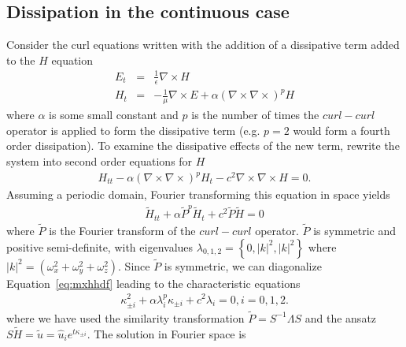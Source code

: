 \documentclass[12pt]{article}
\begin{document}
\subsection{Dissipation in the continuous case}
Consider the curl
equations written with the addition of a dissipative term added to the $H$ equation
\begin{eqnarray}
E_t &=&\frac{1}{\epsilon}\nabla \times H \label{eq:mxed}\\
H_t &=& -\frac{1}{\mu}\nabla \times E +\alpha(\nabla\times\nabla\times)^p H\label{eq:mxhd}
\end{eqnarray}
where $\alpha$ is some small constant and $p$ is the number of times
the $curl-curl$ operator is applied to form the dissipative term
(e.g. $p=2$ would form a fourth order dissipation).  To examine the
dissipative effects of the new term, rewrite the system into 
second order equations for $H$
\begin{eqnarray}
H_{tt} -\alpha(\nabla\times\nabla\times)^p H_t -c^2\nabla \times\nabla \times H = 0\label{eq:mxhhd}.
\end{eqnarray}
Assuming a periodic domain, Fourier transforming this equation in space yields 
\begin{eqnarray}
{\tilde H}_{tt} +\alpha{\tilde P}^p{\tilde H}_t +c^2{\tilde P}{\tilde H} = 0\label{eq:mxhhdf}
\end{eqnarray}
where ${\tilde P}$ is the Fourier transform of the $curl-curl$ operator.  
${\tilde P}$ is symmetric and positive semi-definite, with eigenvalues
$\lambda_{0,1,2}=\left\{0, |k|^2,|k|^2\right\}$ where $|k|^2=(\omega_x^2 + \omega_y^2 +\omega_z^2)$.
Since ${\tilde P}$ is symmetric, we can diagonalize Equation~\ref{eq:mxhhdf} leading to the characteristic equations
\begin{eqnarray}
\kappa_{\pm i}^2 +\alpha\lambda_i^p\kappa_{\pm i} +c^2\lambda_i=0, i=0,1,2.
\end{eqnarray}
where we have used the similarity transformation ${\tilde P} =
S^{-1}\Lambda S$ and the ansatz $S{\tilde H} = {\tilde u} = {\hat
u}_ie^{t\kappa_{\pm i}}$. 
The solution in Fourier space is 
\end{document}
